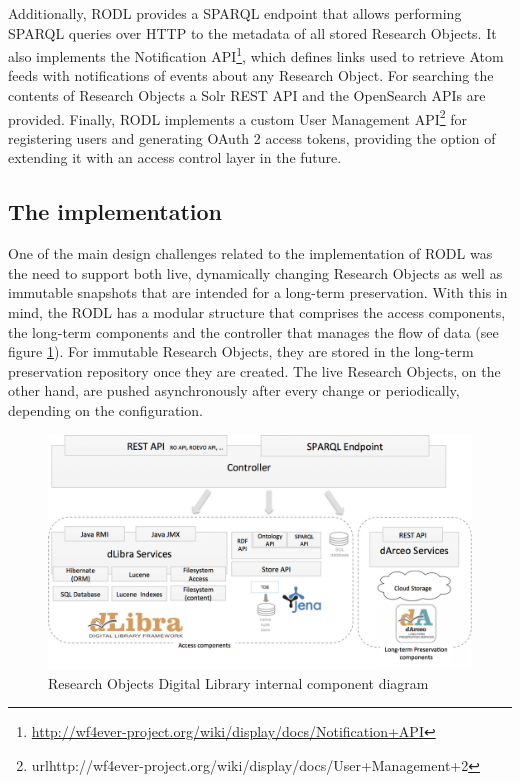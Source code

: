 Additionally, RODL provides a SPARQL endpoint that allows performing SPARQL queries over HTTP to the metadata of all stored Research Objects. It also implements the Notification API\footnote{\url{http://wf4ever-project.org/wiki/display/docs/Notification+API}}, which defines links used to retrieve Atom feeds with notifications of events about any Research Object. For searching the contents of Research Objects a Solr REST API and the OpenSearch APIs are provided. Finally, RODL implements a custom User Management API\footnote{url{http://wf4ever-project.org/wiki/display/docs/User+Management+2}} for registering users and generating OAuth 2 access tokens, providing the option of extending it with an access control layer in the future.



\subsection{The implementation}

One of the main design challenges related to the implementation of RODL was the need to support both live, dynamically changing Research Objects as well as immutable snapshots that are intended for a long-term preservation. With this in mind, the RODL has a modular structure that comprises the access components, the long-term components and the controller that manages the flow of data (see figure \ref{RODL}). For immutable Research Objects, they are stored in the long-term preservation repository once they are created. The live Research Objects, on the other hand, are pushed asynchronously after every change or periodically, depending on the configuration.

\begin{figure}[!hb]
\centering
\includegraphics[width=\textwidth]{Figures/RODL-new.png}
\caption{Research Objects Digital Library internal component diagram}
\label{RODL}
\end{figure}


